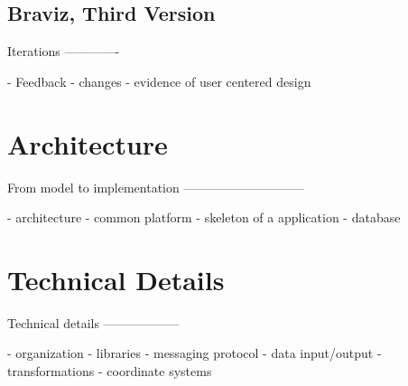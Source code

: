 \subsection{Braviz, Third Version}


Iterations
-------------

- Feedback
- changes
- evidence of user centered design








\section{Architecture}

From model to implementation
-----------------------------

- architecture
- common platform
- skeleton of a application
- database


\section{Technical Details}

Technical details
------------------

- organization
- libraries
- messaging protocol
- data input/output
- transformations
- coordinate systems



